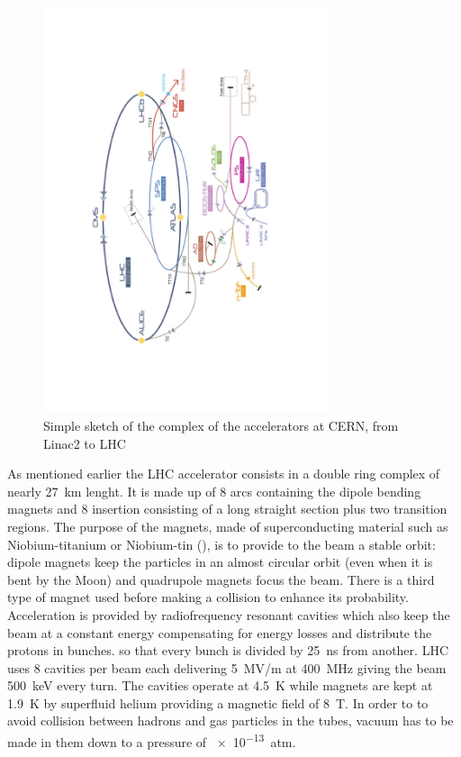 \begin{figure}[tp]
	\centering
	\includegraphics[width=0.75\textwidth,angle=-90]{LHC_ATLAS/CERNaccelerators}
	\caption{Simple sketch of the complex of the accelerators at CERN, from Linac2 to LHC}	
	\label{fig:accelerators}
\end{figure}

As mentioned earlier the LHC accelerator consists in a double ring complex of nearly \SI{27}{km} lenght. It is made up of 8 arcs containing the dipole bending magnets and 8 insertion consisting of a long straight section plus two transition regions. The purpose of the magnets, made of superconducting material such as Niobium-titanium or Niobium-tin (), is to provide to the beam a stable orbit: dipole magnets keep the particles in an almost circular orbit (even when it is bent by the Moon) and quadrupole magnets focus the beam. There is a third type of magnet used before making a collision to enhance its probability. Acceleration is provided by radiofrequency resonant cavities which also keep the beam at a constant energy compensating for energy losses and distribute the protons in bunches. so that every bunch is divided by \SI{25}{ns} from another. LHC uses 8 cavities per beam each delivering \SI{5}{MV/m} at \SI{400}{MHz} giving the beam \SI{500}{keV} every turn. The cavities operate at \SI{4.5}{K} while magnets are kept at \SI{1.9}{K} by superfluid helium providing a magnetic field of \SI{8}{T}.
In order to to avoid collision between hadrons and gas particles in the tubes, vacuum has to be made in them down to a pressure of \SI{e-13}{atm}.

